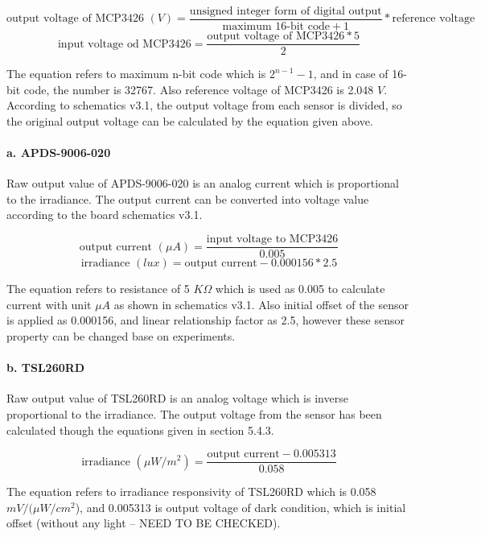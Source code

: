{\centering
 \[ \text{output voltage of MCP3426 }(V) = \frac{\text{unsigned integer form of digital output}}{\text{maximum 16-bit code} + 1} * \text{reference voltage} \]
 \[ \text{input voltage od MCP3426} = \frac{\text{output voltage of MCP3426} * 5}{2} \]
 \par
 }

\bigbreak
The equation refers to maximum n-bit code which is \( 2^{n - 1} - 1 \), and in case of 16-bit code, the number is 32767. Also reference voltage of MCP3426 is 2.048 \(V\). According to schematics v3.1, the output voltage from each sensor is divided, so the original output voltage can be calculated by the equation given above.

\paragraph{a. APDS-9006-020}

Raw output value of APDS-9006-020 is an analog current which is proportional to the irradiance. The output current can be converted into voltage value according to the board schematics v3.1.

{\centering
 \[ \text{output current }(\mu A) = \frac{\text{input voltage to MCP3426}}{0.005} \] 
 \[ \text{irradiance } (lux) = {\text{output current} - 0.000156} * 2.5 \]
 \par
 }
 
\bigbreak
The equation refers to resistance of 5 \(K \Omega \) which is used as 0.005 to calculate current with unit \(\mu A\) as shown in schematics v3.1. Also initial offset of the sensor is applied as 0.000156, and linear relationship factor as 2.5, however these sensor property can be changed base on experiments.
 
\paragraph{b. TSL260RD}

Raw output value of TSL260RD is an analog voltage which is inverse proportional to the irradiance. The output voltage from the sensor has been calculated though the equations given in section 5.4.3.

{\centering
 \[ \text{irradiance } (\mu W/m^2) = \frac{\text{output current} - 0.005313}{0.058} \]
 \par
 }
 
 \bigbreak
 The equation refers to irradiance responsivity of TSL260RD which is 0.058 \(mV/(\mu W/cm^2\)), and 0.005313 is output voltage of dark condition, which is initial offset (without any light -- NEED TO BE CHECKED).
 

